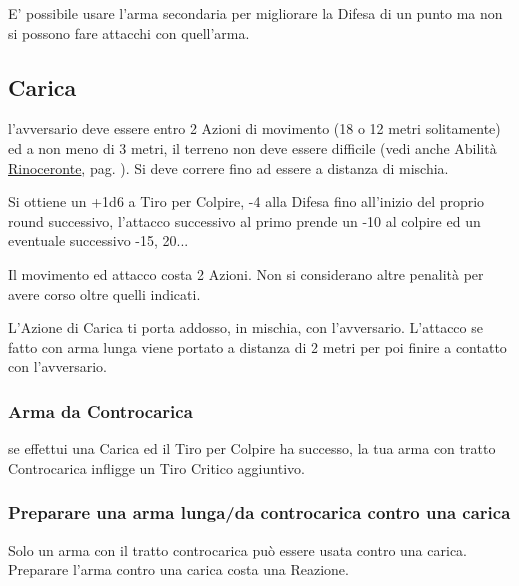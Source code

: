 \begin{multicols}{2}
E' possibile usare l'arma secondaria per migliorare la Difesa di un punto ma non si possono fare attacchi con quell'arma.

\subsection{Carica} \label{carica}\hypertarget{carica}{}

l'avversario deve essere entro 2 Azioni di movimento (18 o 12 metri solitamente) ed a non meno di 3 metri, il terreno non deve essere difficile (vedi anche Abilità \hyperlink{abRinoceronte}{Rinoceronte}, pag. \pageref{Rinoceronte}). Si deve correre fino ad essere a distanza di mischia.

Si ottiene un +1d6 a Tiro per Colpire, -4 alla Difesa fino all'inizio del proprio round successivo, l'attacco successivo al primo prende un -10 al colpire ed un eventuale successivo -15, 20...

Il movimento ed attacco costa 2 Azioni. Non si considerano altre penalità per avere corso oltre quelli indicati.

L'Azione di Carica ti porta addosso, in mischia, con l'avversario. L'attacco se fatto con arma lunga viene portato a distanza di 2 metri per poi finire a contatto con l'avversario.



\subsubsection{Arma da Controcarica}\label{controcarica}\label{caricaarmadacontrocarica}

se effettui una Carica ed il Tiro per Colpire ha successo, la tua arma con tratto Controcarica infligge un Tiro Critico aggiuntivo.


\subsubsection{Preparare una arma lunga/da controcarica contro una carica} \label{prepararearmalungacontrocarica}

Solo un arma con il tratto controcarica può essere usata contro una carica. Preparare l'arma contro una carica costa una Reazione.


\end{multicols}
